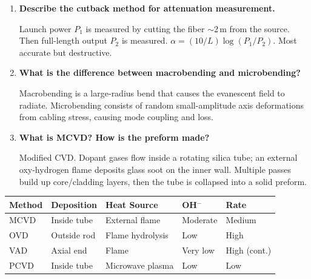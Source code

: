 \documentclass[12pt,a4paper]{article}
\newcommand{\Q}[1]{\textbf{#1}\par\noindent\ignorespaces}
\renewcommand{\arraystretch}{1.45}
\begin{document}
\begin{tcolorbox}[exambox, title={\textbf{Frequently Asked / Viva Questions}}]
\begin{enumerate}[topsep=0pt, label=\textbf{Q\arabic*.}, itemsep=5pt]
  \item \Q{Describe the cutback method for attenuation measurement.}
    Launch power $P_1$ is measured by cutting the fiber $\sim$2\,m from the source. Then full-length output $P_2$ is measured. $\alpha = (10/L)\log(P_1/P_2)$. Most accurate but destructive.
  \item \Q{What is the difference between macrobending and microbending?}
    Macrobending is a large-radius bend that causes the evanescent field to radiate. Microbending consists of random small-amplitude axis deformations from cabling stress, causing mode coupling and loss.
  \item \Q{What is MCVD? How is the preform made?}
    Modified CVD. Dopant gases flow inside a rotating silica tube; an external oxy-hydrogen flame deposits glass soot on the inner wall. Multiple passes build up core/cladding layers, then the tube is collapsed into a solid preform.
\end{enumerate}
\end{tcolorbox}

\begin{tcolorbox}[tikzbox, title={Comparison: Fabrication Methods}]
\centering
{\renewcommand{\arraystretch}{1.45}
\begin{tabularx}{\linewidth}{|B{2.2cm}|Y|Y|Y|Y|}
\hline
\textbf{Method} & \textbf{Deposition} & \textbf{Heat Source} & \textbf{OH$^-$} & \textbf{Rate} \\
\hline
MCVD & Inside tube & External flame & Moderate & Medium \\
\hline
OVD & Outside rod & Flame hydrolysis & Low & High \\
\hline
VAD & Axial end & Flame & Very low & High (cont.) \\
\hline
PCVD & Inside tube & Microwave plasma & Low & Low \\
\hline
\end{tabularx}}
\end{tcolorbox}
\end{document}
